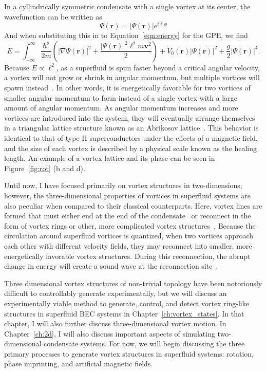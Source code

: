 In a cyllindrically symmetric condensate with a single vortex at its center, the wavefunction can be written as
\begin{equation}
\Psi(\mathbf{r}) = |\Psi(\mathbf{r})|e^{i\ell\phi}
\end{equation}
And when substituting this in to Equation~\eqref{eqn:energy} for the GPE, we find
\begin{equation}
E = \int_{-\infty}^\infty \frac{\hbar^2}{2m}\left( |\nabla\Psi(\mathbf{r})|^2 + \frac{|\Psi(\mathbf{r})|^2\ell^2 m\mathbf{v}^2}{2}\right) + V_0(\mathbf{r})|\Psi(\mathbf{r})|^2 + \frac{g}{2}|\Psi(\mathbf{r})|^4.
\end{equation}
\noindent Because $E \propto \ell^2$, as a superfluid is spun faster beyond a critical angular velocity, a vortex will not grow or shrink in angular momentum, but multiple vortices will spawn instead~\cite{pethick2002}.
In other words, it is energetically favorable for two vortices of smaller angular momentum to form instead of a single vortex with a large amount of angular momentum.
As angular momentum increases and more vortices are introduced into the system, they will eventually arrange themselves in a triangular lattice structure known as an Abrikosov lattice~\cite{abrikosov1957, fetter2001}.
This behavior is identical to that of type II superconductors under the effects of a magnetic field, and the size of each vortex is described by a physical scale known as the healing length.
An example of a vortex lattice and its phase can be seen in Figure~\ref{fig:rot} (b and d).

Until now, I have focused primarily on vortex structures in two-dimensions; however, 
the three-dimensional properties of vortices in superfluid systems are also peculiar when compared to their classical counterparts.
Here, vortex lines are formed that must either end at the end of the condensate~\cite{madison2000} or reconnect in the form of vortex rings or other, more complicated vortex structures~\cite{reichl2013, barenghi2014}.
Because the circulation around superfluid vortices is quantized, when two vortices approach each other with different velocity fields, they may reconnect into smaller, more energetically favorable vortex structures.
During this reconnection, the abrupt change in energy will create a sound wave at the reconnection site~\cite{feynman1955}.

Three dimensional vortex structures of non-trivial topology have been notoriously difficult to controllably generate experimentally, but we will discuss an experimentally viable method to generate, control, and detect vortex ring-like structures in superfluid BEC systems in Chapter~\ref{ch:vortex_states}.
In that chapter, I will also further discuss three-dimensional vortex motion.
In Chapter~\ref{ch:2d}, I will also discuss important aspects of simulating two-dimensional condensate systems.
 For now, we will begin discussing the three primary processes to generate vortex structures in superfluid systems: rotation, phase imprinting, and artificial magnetic fields.

